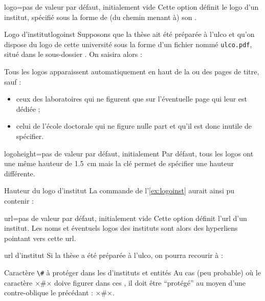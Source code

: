 \begin{docKey}{logo}{=}{pas de valeur
    par défaut, initialement vide}
  Cette option définit le logo d'un institut, spécifié sous la forme de (du
  chemin menant à) son .
  \begin{dbexample}{Logo d'institut}{logoinst}
    Supposons que la thèse ait été préparée à l'\gls{ulco} et qu'on dispose du
    logo de cette université sous la forme d'un fichier nommé
    \texttt{ulco.pdf}, situé dans le sous-dossier . On
    saisira alors :
\begin{bodycode}
\end{bodycode}
\end{dbexample}
Tous les logos apparaissent automatiquement en haut de la ou des
pages de titre, sauf :
\begin{itemize}
\item ceux des laboratoires qui ne figurent que sur l'éventuelle page qui leur
  est dédiée ;
\item celui de l'école doctorale qui ne figure nulle part et qu'il est donc
  inutile de spécifier.
\end{itemize}
\end{docKey}
%
\begin{docKey}{logoheight}{=}{pas de valeur par
    défaut, initialement \docValue*{1.5cm}}
  Par défaut, tous les logos ont une même hauteur de \SI{1.5}{\cm}
  mais la clé  permet de spécifier une hauteur
  différente.
  \begin{dbexample}{Hauteur du logo d'institut}{}
    La commande de l'\vref{ex:logoinst} aurait ainsi pu contenir :
\begin{bodycode}
\end{bodycode}
\end{dbexample}
\end{docKey}
%
%
\begin{docKey}{url}{=}{pas de valeur par
    défaut, initialement vide}
  Cette option définit l'\acrshort{url} d'un institut. Les noms et
  éventuels logos des instituts sont alors des hyperliens pointant
  vers cette \acrshort{url}.
  \begin{dbexample}{\acrshort*{url} d'institut}{}
    Si la thèse a été préparée à l'\gls{ulco}, on pourra recourir à :%
    \NoAutoSpacing%
\begin{bodycode}
\end{bodycode}
\end{dbexample}
\begin{dbwarning}{Caractère \protect\lstinline+\#+ à protéger dans les
     d'instituts et entités}{}
  Au cas (peu probable) où le caractère ×#× doive figurer dans ces
  , il doit être \enquote{protégé} au moyen d'une
  contre-oblique le précédant : ×\#×.
\end{dbwarning}
\end{docKey}

